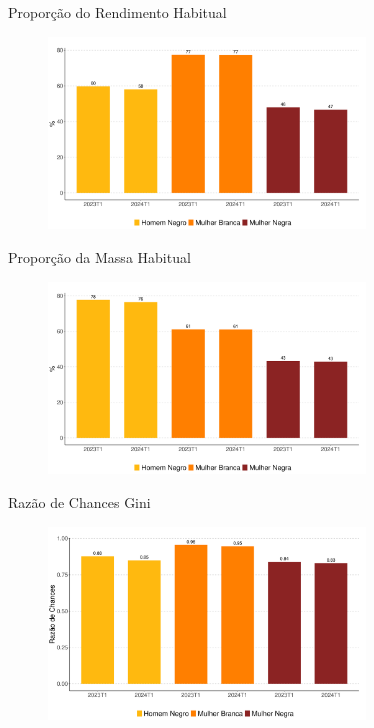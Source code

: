 \documentclass[10pt, xcolor=x11names,compress]{beamer}
\begin{document}
	\begin{frame}{Proporção do Rendimento Habitual}
		\begin{figure}
			\centering
			\includegraphics[width = 0.75\textwidth]{../figures_output/frac_rendimento_habitual.pdf}
		\end{figure}
	\end{frame}
	
	\begin{frame}{Proporção da Massa Habitual}
		\begin{figure}
			\centering
			\includegraphics[width = 0.75\textwidth]{../figures_output/frac_massa_habitual.pdf}
		\end{figure}
	\end{frame}
	
	
	\begin{frame}{Razão de Chances Gini}
		\begin{figure}
			\centering
			\includegraphics[width = 0.75\textwidth]{../figures_output/frac_gini.pdf}
		\end{figure}
	\end{frame}
	
\end{document}
